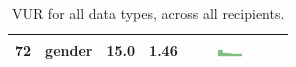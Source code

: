 \begin{table}[t]
\begin{center}
\begin{tabular}{| r | l | r | r | r | r |}
72 & gender & 15.0 & 1.46 &  \includegraphics[width = 2cm, height = 0.5cm]{tex-inputs/table-images/learnedyourgendercombined} \\ 
\hline
\end{tabular}
\caption{VUR for all data types, across all recipients.}
\label{full-vur-table}
\end{center}
\end{table}
